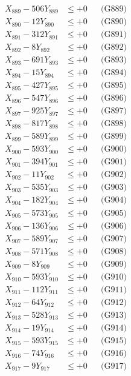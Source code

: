 \documentclass[a4paper,10pt]{article}
\begin{document}
{\begin{align}
X_{889} - 506Y_{889} &\leq +0 && \text{(G889)} \\
X_{890} - 12Y_{890} &\leq +0 && \text{(G890)} \\
\allowbreak
X_{891} - 312Y_{891} &\leq +0 && \text{(G891)} \\
X_{892} - 8Y_{892} &\leq +0 && \text{(G892)} \\
X_{893} - 691Y_{893} &\leq +0 && \text{(G893)} \\
X_{894} - 15Y_{894} &\leq +0 && \text{(G894)} \\
X_{895} - 427Y_{895} &\leq +0 && \text{(G895)} \\
X_{896} - 547Y_{896} &\leq +0 && \text{(G896)} \\
X_{897} - 925Y_{897} &\leq +0 && \text{(G897)} \\
X_{898} - 817Y_{898} &\leq +0 && \text{(G898)} \\
X_{899} - 589Y_{899} &\leq +0 && \text{(G899)} \\
X_{900} - 593Y_{900} &\leq +0 && \text{(G900)} \\
\allowbreak
X_{901} - 394Y_{901} &\leq +0 && \text{(G901)} \\
X_{902} - 11Y_{902} &\leq +0 && \text{(G902)} \\
X_{903} - 535Y_{903} &\leq +0 && \text{(G903)} \\
X_{904} - 182Y_{904} &\leq +0 && \text{(G904)} \\
X_{905} - 573Y_{905} &\leq +0 && \text{(G905)} \\
X_{906} - 136Y_{906} &\leq +0 && \text{(G906)} \\
X_{907} - 589Y_{907} &\leq +0 && \text{(G907)} \\
X_{908} - 571Y_{908} &\leq +0 && \text{(G908)} \\
X_{909} - 8Y_{909} &\leq +0 && \text{(G909)} \\
X_{910} - 593Y_{910} &\leq +0 && \text{(G910)} \\
\allowbreak
X_{911} - 112Y_{911} &\leq +0 && \text{(G911)} \\
X_{912} - 64Y_{912} &\leq +0 && \text{(G912)} \\
X_{913} - 528Y_{913} &\leq +0 && \text{(G913)} \\
X_{914} - 19Y_{914} &\leq +0 && \text{(G914)} \\
X_{915} - 593Y_{915} &\leq +0 && \text{(G915)} \\
X_{916} - 74Y_{916} &\leq +0 && \text{(G916)} \\
X_{917} - 9Y_{917} &\leq +0 && \text{(G917)} \\

\end{align}}
\end{document}
